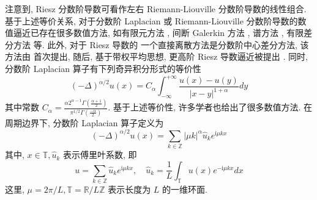 注意到, Riesz 分数阶导数可看作左右 Riemann-Liouville 分数阶导数的线性组合.
基于上述等价关系, 对于分数阶 Laplacian 或 Riemann-Liouville 分数阶导数的数值逼近已存在很多数值方法, 如有限元方法 \cite{dengFiniteElementMethod2009,ervinNumericalApproximationTime2007}, 间断 Galerkin 方法 \cite{xuDiscontinuousGalerkinMethod2014}, 谱方法 \cite{zayernouriFractionalSpectralCollocation2014,zengCrankNicolsonADI2014}, 有限差分方法 \cite{chenFourthOrderAccurate2014,meerschaertFiniteDifferenceApproximations2004} 等. 
此外, 对于 Riesz 导数的 一个直接离散方法是分数阶中心差分方法, 该方法由 \cite{duAnalysisApproximationNonlocal2012} 首次提出, 随后, 基于带权平均思想, 更高阶 Riesz 导数逼近被提出 \cite{dingHighorderAlgorithmsRiesz2015,zhangFourthOrderCompactDifference2014}.
同时, 分数阶 Laplacian 算子有下列奇异积分形式的等价性 \cite{duAnalysisApproximationNonlocal2012}
\begin{equation}
(-\Delta)^{\alpha / 2} u(x)=C_\alpha \int_{-\infty}^{+\infty} \frac{u(x)-u(y)}{|x-y|^{1+\alpha}} d y
\end{equation}
其中常数 $C_\alpha=\frac{\alpha 2^{\alpha-1} \Gamma\left(\frac{\alpha+1}{2}\right)}{\pi^{1 / 2} \Gamma\left(\frac{-\alpha}{2}\right)}$. 基于上述等价性, 许多学者也给出了很多数值方法\cite{gaoMeanExitTime2014,huangNumericalMethodsFractional2014}. 在周期边界下, 分数阶 Laplacian 算子定义为 \cite{guoFractionalPartialDifferential2015}
\begin{equation}
(-\Delta)^{\alpha / 2} u(x)=\sum_{k \in \mathbb{Z}}|\mu k|^\alpha \hat{u}_k e^{\mathrm{i} \mu k x}
\end{equation}
其中, $x \in \mathbb{T}, \hat{u}_k$ 表示傅里叶系数, 即
\begin{equation}
u=\sum_{k \in \mathbb{Z}} \hat{u}_k e^{\mathrm{i} \mu k x}, \quad \hat{u}_k=\frac{1}{L} \int_{\mathbb{T}} u(x) e^{-\mathrm{i} \mu k x} d x
\end{equation}
这里, $\mu=2 \pi / L, \mathbb{T}=\mathbb{R} / L \mathbb{Z}$ 表示长度为 $L$ 的一维环面.

